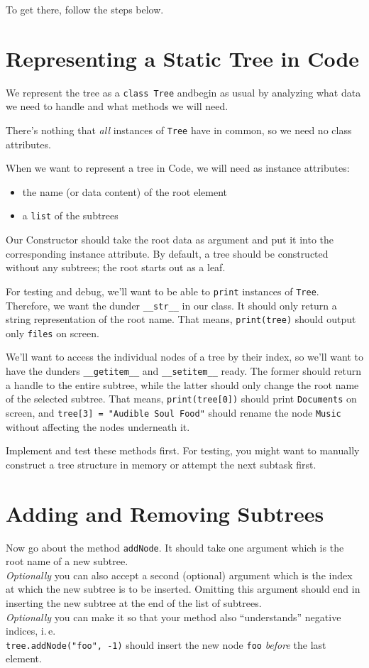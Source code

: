 \documentclass[
	english,
	fontsize=10pt,
	parskip=half,
	titlepage=true,
	DIV=12
]{scrartcl}
\newcommand*{\inPy}[1]{\texttt{#1}}
\newcommand*{\ie}{i.\,e.}
\begin{document}
To get there, follow the steps below.

\section{Representing a Static Tree in Code}
We represent the tree as a \inPy{class Tree} andbegin as usual by analyzing what data we need to handle and what methods we will need.

There's nothing that \emph{all} instances of \texttt{Tree} have in common, so we need no class attributes.

When we want to represent a tree in Code, we will need as instance attributes:
\begin{itemize}
\item the name (or data content) of the root element
\item a \inPy{list} of the subtrees
\end{itemize}

Our Constructor should take the root data as argument and put it into the corresponding instance attribute. By default, a tree should be constructed without any subtrees; the root starts out as a leaf.

For testing and debug, we'll want to be able to \inPy{print} instances of \texttt{Tree}. Therefore, we want the dunder \inPy{__str__} in our class. It should only return a string representation of the root name. That means, \inPy{print(tree)} should output only \texttt{files} on screen.

We'll want to access the individual nodes of a tree by their index, so we'll want to have the dunders \inPy{__getitem__} and \inPy{__setitem__} ready. The former should return a handle to the entire subtree, while the latter should only change the root name of the selected subtree. That means, \inPy{print(tree[0])} should print \texttt{Documents} on screen, and \texttt{tree[3] = "Audible Soul Food"} should rename the node \texttt{Music} without affecting the nodes underneath it.

Implement and test these methods first. For testing, you might want to manually construct a tree structure in memory or attempt the next subtask first.

\section{Adding and Removing Subtrees}
Now go about the method \texttt{addNode}. It should take one argument which is the root name of a new subtree.\\
\emph{Optionally} you can also accept a second (optional) argument which is the index at which the new subtree is to be inserted. Omitting this argument should end in inserting the new subtree at the end of the list of subtrees.\\
\emph{Optionally} you can make it so that your method also \enquote{understands} negative indices, \ie\\
\texttt{tree.addNode("foo", -1)} should insert the new node \texttt{foo} \emph{before} the last element.
\end{document}
